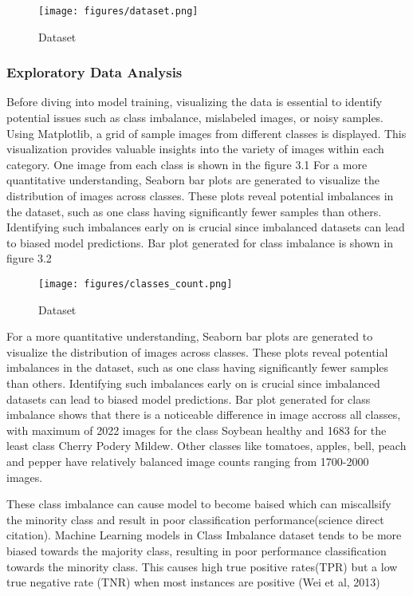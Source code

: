 \begin{figure}[h]
    \centering
    \texttt{[image: figures/dataset.png]}
    \captionsetup{labelsep=colon, justification=centering, labelfont=bf}
    \caption{Dataset}
\end{figure}


\subsubsection{Exploratory Data Analysis}
Before diving into model training, visualizing the data is essential to identify potential issues such as class imbalance, mislabeled images,
or noisy samples. Using Matplotlib, a grid of sample images from different classes is displayed. This visualization provides valuable 
insights into the variety of images within each category. One image from each class is shown in the figure 3.1 For a more quantitative understanding, Seaborn bar plots are generated to visualize the distribution of images across classes. 
These plots reveal potential imbalances in the dataset, such as one class having significantly fewer samples than others. 
Identifying such imbalances early on is crucial since imbalanced datasets can lead to biased model predictions. Bar plot generated for class
imbalance is shown in figure 3.2

\begin{figure}[h]
    \centering
    \texttt{[image: figures/classes\_count.png]}
    \captionsetup{labelsep=colon, justification=centering, labelfont=bf}
    \caption{Dataset}
\end{figure}

For a more quantitative understanding, Seaborn bar plots are generated to visualize the distribution of images across classes. These plots reveal
potential imbalances in the dataset, such as one class having significantly fewer samples
than others. Identifying such imbalances early on is crucial since imbalanced datasets
can lead to biased model predictions. Bar plot generated for class imbalance shows that there is a noticeable difference in image accross all classes, with maximum of 2022 images for the class Soybean healthy
and 1683 for the least class Cherry Podery Mildew. Other classes like tomatoes, apples, bell, peach and pepper have relatively balanced image 
counts ranging from 1700-2000 images.

These class imbalance can cause model to become baised which can miscallsify the minority class and result
in poor classification performance(science direct citation). Machine Learning models in Class Imbalance dataset tends to be more biased towards the
majority class, resulting in poor performance classification towards the minority class. This causes high true positive rates(TPR) but a
low true negative rate (TNR) when most instances are positive (Wei et al, 2013)

